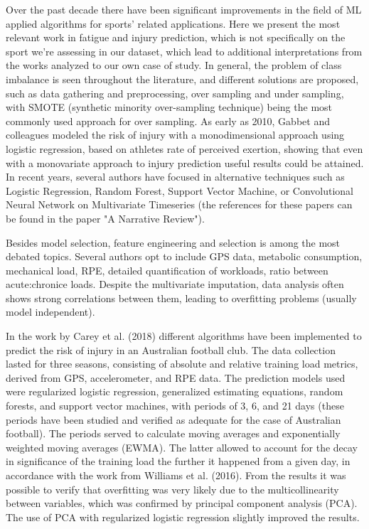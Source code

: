 \documentclass[conference]{IEEEtran}
\begin{document}
Over the past decade there have been significant improvements in the field of ML applied algorithms for sports' related applications. Here we present the most relevant work in fatigue and injury prediction, which is not specifically on the sport we're assessing in our dataset, which lead to additional interpretations from the works analyzed to our own case of study. In general, the problem of class imbalance is seen throughout the literature, and different solutions are proposed, such as data gathering and preprocessing, over sampling and under sampling, with SMOTE (synthetic minority over-sampling technique) being the most commonly used approach for over sampling. As early as 2010, Gabbet and colleagues modeled the risk of injury with a monodimensional approach using logistic regression, based on athletes rate of perceived exertion, showing that even with a monovariate approach to injury prediction useful results could be attained. In recent years, several authors have focused in alternative techniques such as Logistic Regression, Random Forest, Support Vector Machine, or Convolutional Neural Network on Multivariate Timeseries (the references for these papers can be found in the paper "A Narrative Review").

Besides model selection, feature engineering and selection is among the most debated topics. Several authors opt to include GPS data, metabolic consumption, mechanical load, RPE, detailed quantification of workloads, ratio between acute:chronice loads. Despite the multivariate imputation, data analysis often shows strong correlations between them, leading to overfitting problems (usually model independent).

In the work by Carey et al. (2018) different algorithms have been implemented to predict the risk of injury in an Australian football club. The data collection lasted for three seasons, consisting of absolute and relative training load metrics, derived from GPS, accelerometer, and RPE data. The prediction models used were regularized logistic regression, generalized estimating equations, random forests, and support vector machines, with periods of 3, 6, and 21 days (these periods have been studied and verified as adequate for the case of Australian football). The periods served to calculate moving averages and exponentially weighted moving averages (EWMA). The latter allowed to account for the decay in significance of the training load the further it happened from a given day, in accordance with the work from Williams et al. (2016). From the results it was possible to verify that overfitting was very likely due to the multicollinearity between variables, which was confirmed by principal component analysis (PCA). The use of PCA with regularized logistic regression slightly improved the results.
\end{document}
